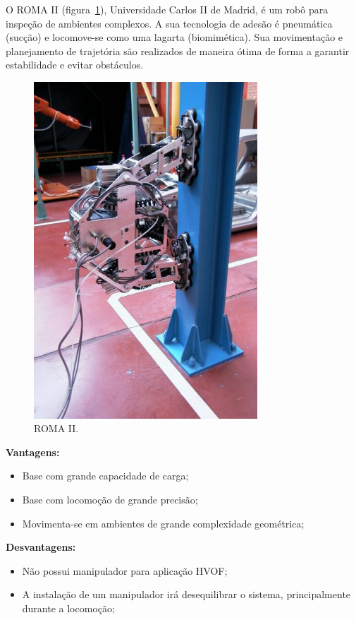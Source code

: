 O ROMA II (figura~\ref{roma2}), Universidade Carlos II de Madrid, é um robô para
inspeção de ambientes complexos. A sua tecnologia de adesão é pneumática (sucção) e
locomove-se como uma lagarta (biomimética). Sua movimentação e planejamento de
trajetória são realizados de maneira ótima de forma a garantir estabilidade e
evitar obstáculos. 

\begin{figure}[ht]
\centering
\includegraphics[width=8.4cm]{figs/climbers/roma2.jpg}
\caption{ROMA II.}
\label{roma2}
\end{figure}

\textbf{Vantagens:}
\begin{itemize}
  \item Base com grande capacidade de carga;
  \item Base com locomoção de grande precisão;
  \item Movimenta-se em ambientes de grande complexidade geométrica; 
\end{itemize}

\textbf{Desvantagens:}
\begin{itemize}
  \item Não possui manipulador para aplicação HVOF;
  \item A instalação de um manipulador irá desequilibrar o sistema,
  principalmente durante a locomoção;
\end{itemize}


